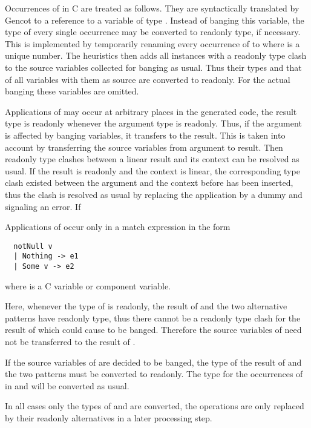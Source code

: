 Occurrences of  in C are treated as follows. They are syntactically translated by Gencot to a reference to a
variable  of type . Instead of banging this variable, the type of every single
occurrence may be converted to readonly type, if necessary. This is implemented by temporarily renaming every occurrence of
 to  where  is a unique number. The heuristics then adds all instances
with a readonly type clash to the source variables collected for banging as usual. Thus their types and that of all variables
with them as source are converted to readonly. For the actual banging these variables are omitted.

Applications of  may occur at arbitrary places in the generated code, the result type is readonly whenever the
argument type is readonly. Thus, if the argument is affected by banging variables, it transfers to the result. This is taken
into account by transferring the source variables from argument to result. Then readonly type clashes between a linear result
and its context can be resolved as usual. If the result is readonly and the context is linear, the corresponding type clash
existed between the argument and the context before  has been inserted, thus the clash is resolved as usual
by replacing the  application by a dummy and signaling an error. If

Applications of  occur only in a match expression in the form
\begin{verbatim}
  notNull v
  | Nothing -> e1
  | Some v -> e2
\end{verbatim}
where  is a C variable or component variable.

Here, whenever the type of  is readonly, the result of  and the two alternative patterns have readonly type,
thus there cannot be a readonly type clash for the result of  which could cause  to be banged. Therefore
the source variables of  need not be transferred to the result of .

If the source variables of  are decided to be banged, the type of the result of  and the two patterns must
be converted to readonly. The type for the occurrences of  in  and  will be converted as usual.

In all cases only the types of  and  are converted, the operations are only replaced by their readonly
alternatives in a later processing step.

